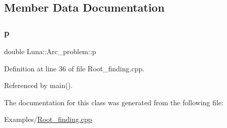 \subsection{Member Data Documentation}
\mbox{\label{classLuna_1_1Arc__problem_ab747ff77d23c83ebf8e0e8ab58e9c432}} 
\subsubsection{\texorpdfstring{p}{p}}
{\footnotesize\ttfamily double Luna\+::\+Arc\+\_\+problem\+::p}



Definition at line 36 of file Root\+\_\+finding.\+cpp.



Referenced by main().



The documentation for this class was generated from the following file\+:\begin{DoxyCompactItemize}
\item 
Examples/\hyperlink{Root__finding_8cpp}{Root\+\_\+finding.\+cpp}\end{DoxyCompactItemize}
